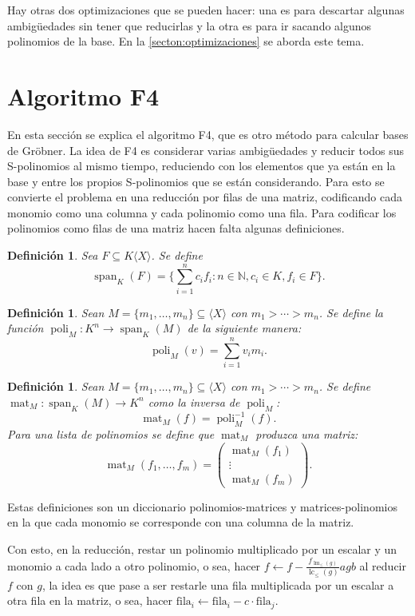 \documentclass[12pt]{report}
\theoremstyle{customstyle}
\newtheorem{definition}[theorem]{Definición}
\theoremstyle{factstyle}
\DeclareMathOperator{\lm}{lm}
\DeclareMathOperator{\lc}{lc}
\DeclareMathOperator{\spn}{span} %
\DeclareMathOperator{\mat}{mat}
\DeclareMathOperator{\poli}{poli}
\begin{document}
Hay otras dos optimizaciones que se pueden hacer: una es para descartar algunas ambigüedades sin tener que reducirlas y la otra es para ir sacando algunos polinomios de la base. En la \cref{secton:optimizaciones} se aborda este tema.

\section{Algoritmo F4}
En esta sección se explica el algoritmo F4, que es otro método para calcular bases de Gröbner. La idea de F4 es considerar varias ambigüedades y reducir todos sus S-polinomios al mismo tiempo, reduciendo con los elementos que ya están en la base y entre los propios S-polinomios que se están considerando. Para esto se convierte el problema en una reducción por filas de una matriz, codificando cada monomio como una columna y cada polinomio como una fila. Para codificar los polinomios como filas de una matriz hacen falta algunas definiciones.

\begin{definition}
  Sea $F ⊆ K⟨X⟩$. Se define
  \[ \spn_K(F) = \{∑_{i = 1}^n c_i f_i : n ∈ ℕ, c_i ∈ K, f_i ∈ F\} \text{.} \]
\end{definition}

\begin{definition}
  Sean $M = \{m_1, …, m_n\} ⊆ ⟨X⟩$ con $m_1 > ⋯ > m_n$. Se define la función $\poli_M : K^n → \spn_K(M)$ de la siguiente manera:
  \[ \poli_M(v) = ∑_{i = 1}^n v_i m_i \text{.} \]
\end{definition}

\begin{definition}
  Sean $M = \{m_1, …, m_n\} ⊆ ⟨X⟩$ con $m_1 > ⋯ > m_n$. Se define $\mat_M : \spn_K(M) → K^n$ como la inversa de $\poli_M$:
  \[ \mat_M(f) = \poli_M^{-1}(f) \text{.} \]
  Para una lista de polinomios se define que $\mat_M$ produzca una matriz:
  \[ \mat_M(f_1, …, f_m) = \begin{pmatrix} \mat_M(f_1) \\ ⋮ \\ \mat_M(f_m) \end{pmatrix} \text{.} \]
\end{definition}

Estas definiciones son un diccionario polinomios-matrices y matrices-polinomios en la que cada monomio se corresponde con una columna de la matriz.

Con esto, en la reducción, restar un polinomio multiplicado por un escalar y un monomio a cada lado a otro polinomio, o sea, hacer $f ← f - \frac{f_{\lm_≤(g)}}{\lc_≤(g)}a g b$ al reducir $f$ con $g$, la idea es que pase a ser restarle una fila multiplicada por un escalar a otra fila en la matriz, o sea, hacer $\text{fila}_i ← \text{fila}_i - c · \text{fila}_j$.
\end{document}

